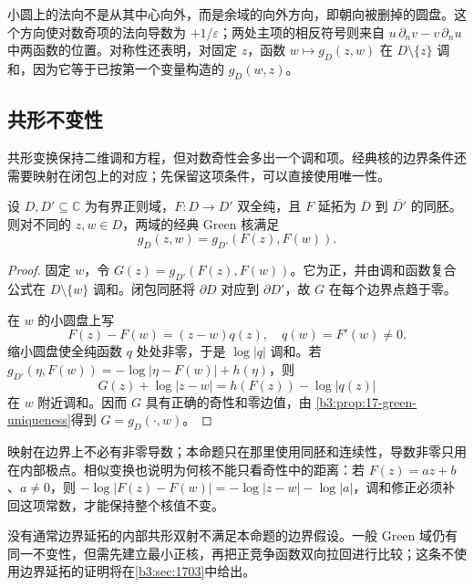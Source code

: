 小圆上的法向不是从其中心向外，而是余域的向外方向，即朝向被删掉的圆盘。这个方向使对数奇项的法向导数为 \(+1/\varepsilon\)；两处主项的相反符号则来自
\(u\,\partial_nv-v\,\partial_nu\) 中两函数的位置。对称性还表明，对固定
\(z\)，函数 \(w\mapsto g_D(z,w)\) 在 \(D\setminus\{z\}\) 调和，因为它等于已按第一个变量构造的 \(g_D(w,z)\)。

\subsection{共形不变性}
\label{b3:subsec:170104}

共形变换保持二维调和方程，但对数奇性会多出一个调和项。经典核的边界条件还需要映射在闭包上的对应；先保留这项条件，可以直接使用唯一性。

\begin{proposition}\label{b3:prop:17-classical-green-conformal}
设 \(D,D'\subseteq\mathbb C\) 为有界正则域，\(F:D\to D'\) 双全纯，且
\(F\) 延拓为 \(\overline D\) 到 \(\overline{D'}\) 的同胚。则对不同的
\(z,w\in D\)，两域的经典 Green 核满足
\[
 g_D(z,w)=g_{D'}(F(z),F(w)).
\]
\end{proposition}
\begin{proof}
固定 \(w\)，令 \(G(z)=g_{D'}(F(z),F(w))\)。它为正，并由调和函数复合公式在
\(D\setminus\{w\}\) 调和。闭包同胚将 \(\partial D\) 对应到
\(\partial D'\)，故 \(G\) 在每个边界点趋于零。

在 \(w\) 的小圆盘上写
\[
 F(z)-F(w)=(z-w)q(z),\quad q(w)=F'(w)\ne0.
\]
缩小圆盘使全纯函数 \(q\) 处处非零，于是 \(\log|q|\) 调和。若
\(g_{D'}(\eta,F(w))=-\log|\eta-F(w)|+h(\eta)\)，则
\[
 G(z)+\log|z-w|=h(F(z))-\log|q(z)|
\]
在 \(w\) 附近调和。因而 \(G\) 具有正确的奇性和零边值，由
\cref{b3:prop:17-green-uniqueness}得到 \(G=g_D(\cdot,w)\)。
\end{proof}

映射在边界上不必有非零导数；本命题只在那里使用同胚和连续性，导数非零只用在内部极点。相似变换也说明为何核不能只看奇性中的距离：若
\(F(z)=az+b\)、\(a\ne0\)，则
\(-\log|F(z)-F(w)|=-\log|z-w|-\log|a|\)，调和修正必须补回这项常数，才能保持整个核值不变。

\ProseParagraphBreak
没有通常边界延拓的内部共形双射不满足本命题的边界假设。一般 Green 域仍有同一不变性，但需先建立最小正核，再把正竞争函数双向拉回进行比较；这条不使用边界延拓的证明将在\cref{b3:sec:1703}中给出。
